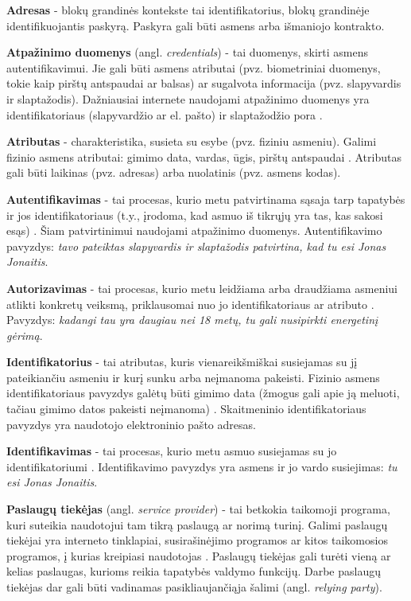 
\textbf{Adresas} - blokų grandinės kontekste tai identifikatorius, blokų grandinėje identifikuojantis paskyrą.
Paskyra gali būti asmens arba išmaniojo kontrakto.

\textbf{Atpažinimo duomenys} (angl. \textit{credentials}) - tai duomenys, skirti asmens autentifikavimui. Jie gali būti asmens atributai
(pvz. biometriniai duomenys, tokie kaip pirštų antspaudai ar balsas) ar sugalvota informacija (pvz. slapyvardis ir slaptažodis). Dažniausiai internete naudojami
atpažinimo duomenys yra identifikatoriaus (slapyvardžio ar el. pašto) ir slaptažodžio pora \cite{Maler2008}.

\textbf{Atributas} - charakteristika, susieta su esybe (pvz. fiziniu asmeniu). Galimi fizinio asmens atributai: gimimo data,
vardas, ūgis, pirštų antspaudai \cite{Camp2004}. Atributas gali būti laikinas (pvz. adresas) arba nuolatinis (pvz. asmens kodas).

\textbf{Autentifikavimas} - tai procesas, kurio metu patvirtinama sąsaja tarp tapatybės ir jos identifikatoriaus (t.y., įrodoma,
kad asmuo iš tikrųjų yra tas, kas sakosi esąs) \cite{Camp2004, Strictest2011}. Šiam patvirtinimui naudojami atpažinimo duomenys. Autentifikavimo pavyzdys:
\textit{tavo pateiktas slapyvardis ir slaptažodis patvirtina, kad tu esi Jonas Jonaitis}.

\textbf{Autorizavimas} - tai procesas, kurio metu leidžiama arba draudžiama asmeniui atlikti konkretų veiksmą, priklausomai
nuo jo identifikatoriaus ar atributo \cite{Camp2004}. Pavyzdys: \textit{kadangi tau yra daugiau nei 18 metų, tu gali nusipirkti
energetinį gėrimą}. 

\textbf{Identifikatorius} - tai atributas, kuris vienareikšmiškai susiejamas su jį pateikiančiu asmeniu ir kurį
sunku arba neįmanoma pakeisti. Fizinio asmens identifikatoriaus pavyzdys galėtų būti gimimo data
(žmogus gali apie ją meluoti, tačiau gimimo datos pakeisti neįmanoma) \cite{Camp2004}. Skaitmeninio identifikatoriaus
pavyzdys yra naudotojo elektroninio pašto adresas.

\textbf{Identifikavimas} - tai procesas, kurio metu asmuo susiejamas su jo identifikatoriumi \cite{Camp2004}. Identifikavimo
pavyzdys yra asmens ir jo vardo susiejimas: \textit{tu esi Jonas Jonaitis}.

\textbf{Paslaugų tiekėjas} (angl. \textit{service provider}) - tai betkokia taikomoji programa, kuri suteikia naudotojui tam tikrą paslaugą ar
norimą turinį. Galimi paslaugų tiekėjai yra interneto tinklapiai, susirašinėjimo programos ar kitos taikomosios programos,
į kurias kreipiasi naudotojas \cite{Pashalidis2003, Samar1999}. Paslaugų tiekėjas gali turėti vieną ar kelias paslaugas,
kurioms reikia tapatybės valdymo funkcijų. Darbe paslaugų tiekėjas dar gali būti vadinamas pasikliaujančiąja šalimi (angl.
\textit{relying party}).

